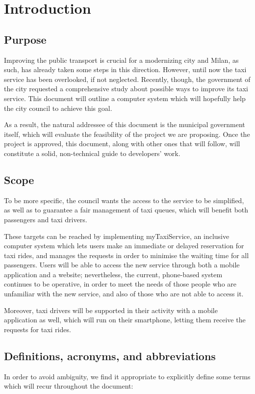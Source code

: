 \chapter{Introduction}


\section{Purpose}
Improving the public transport is crucial for a modernizing city and Milan, as such, has already taken some steps in this direction. However, until now the taxi service has been overlooked, if not neglected. Recently, though, the government of the city requested a comprehensive study about possible ways to improve its taxi service. This document will outline a computer system which will hopefully help the city council to achieve this goal.

As a result, the natural addressee of this document is the municipal government itself, which will evaluate the feasibility of the project we are proposing. Once the project is approved, this document, along with other ones that will follow, will constitute a solid, non-technical guide to developers' work.


\section{Scope}
To be more specific, the council wants the access to the service to be simplified, as well as to guarantee a fair management of taxi queues, which will benefit both passengers and taxi drivers. 

These targets can be reached by implementing myTaxiService, an inclusive computer system which lets users make an immediate or delayed reservation for taxi rides, and manages the requests in order to minimise the waiting time for all passengers. Users will be able to access the new service through both a mobile application and a website; nevertheless, the current, phone-based system continues to be operative, in order to meet the needs of those people who are unfamiliar with the new service, and also of those who are not able to access it. 

Moreover, taxi drivers will be supported in their activity with a mobile application as well, which will run on their smartphone, letting them receive the requests for taxi rides.


\section{Definitions, acronyms, and abbreviations}
In order to avoid ambiguity, we find it appropriate to explicitly define some terms which will recur throughout the document:

